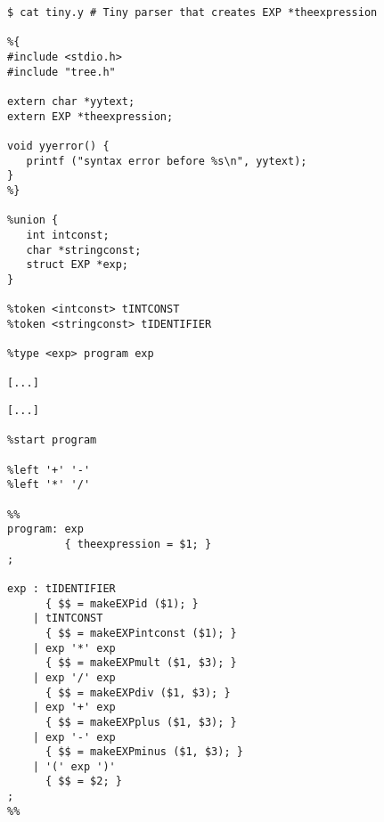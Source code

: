 \begin{slide*}
\begin{scriptsize}
\begin{verbatim}
$ cat tiny.y # Tiny parser that creates EXP *theexpression

%{
#include <stdio.h>
#include "tree.h"

extern char *yytext;
extern EXP *theexpression;

void yyerror() {
   printf ("syntax error before %s\n", yytext);
}
%}

%union {
   int intconst;
   char *stringconst;
   struct EXP *exp;
}

%token <intconst> tINTCONST
%token <stringconst> tIDENTIFIER 

%type <exp> program exp

[...]
\end{verbatim}
\end{scriptsize}
\vfil
\end{slide*}
 
\begin{slide*}
\begin{scriptsize}
\begin{verbatim}
[...]

%start program

%left '+' '-'
%left '*' '/'

%% 
program: exp
         { theexpression = $1; }
;

exp : tIDENTIFIER
      { $$ = makeEXPid ($1); }
    | tINTCONST
      { $$ = makeEXPintconst ($1); }
    | exp '*' exp
      { $$ = makeEXPmult ($1, $3); }
    | exp '/' exp
      { $$ = makeEXPdiv ($1, $3); }
    | exp '+' exp
      { $$ = makeEXPplus ($1, $3); }
    | exp '-' exp
      { $$ = makeEXPminus ($1, $3); }
    | '(' exp ')'
      { $$ = $2; }
;
%%
\end{verbatim}
\end{scriptsize}
\vfil
\end{slide*}

